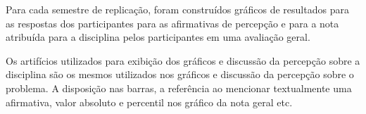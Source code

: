 

Para cada semestre de replicação, foram construídos gráficos
de resultados para as respostas dos participantes para as afirmativas
de percepção e para a nota atribuída para a disciplina pelos participantes
em uma avaliação geral.

Os artifícios utilizados para exibição dos gráficos e
discussão da percepção sobre a disciplina são os mesmos
utilizados nos gráficos e discussão da percepção sobre
o problema.
A disposição nas barras, a referência ao mencionar textualmente
uma afirmativa, valor absoluto e percentil nos gráfico da
nota geral etc.
















